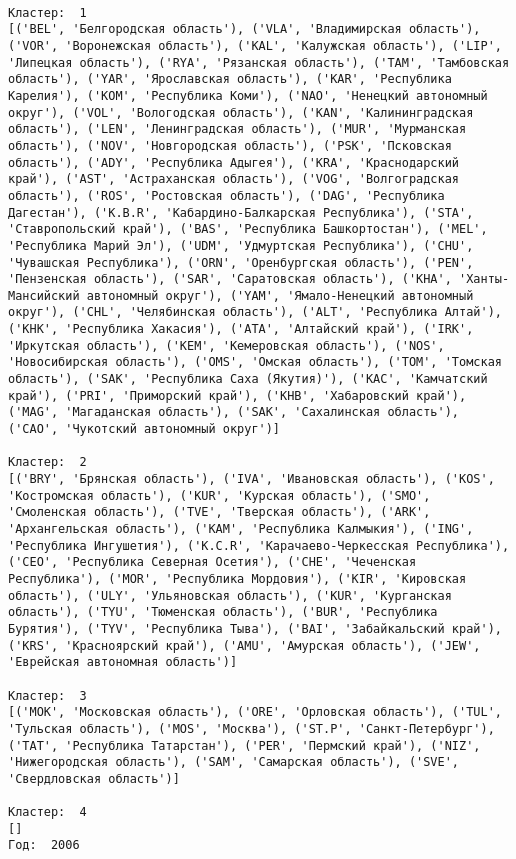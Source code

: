 \documentclass[11pt]{article}
\begin{document}
    \begin{Verbatim}[commandchars=\\\{\}]

Кластер:  1
[('BEL', 'Белгородская область'), ('VLA', 'Владимирская область'), ('VOR', 'Воронежская область'), ('KAL', 'Калужская область'), ('LIP', 'Липецкая область'), ('RYA', 'Рязанская область'), ('TAM', 'Тамбовская область'), ('YAR', 'Ярославская область'), ('KAR', 'Республика Карелия'), ('KOM', 'Республика Коми'), ('NAO', 'Ненецкий автономный округ'), ('VOL', 'Вологодская область'), ('KAN', 'Калинингpадская область'), ('LEN', 'Ленинградская область'), ('MUR', 'Мурманская область'), ('NOV', 'Новгородская область'), ('PSK', 'Псковская область'), ('ADY', 'Республика Адыгея'), ('KRA', 'Краснодарский край'), ('AST', 'Астраханская область'), ('VOG', 'Волгоградская область'), ('ROS', 'Ростовская область'), ('DAG', 'Республика Дагестан'), ('K.B.R', 'Кабардино-Балкарская Республика'), ('STA', 'Ставропольский край'), ('BAS', 'Республика Башкортостан'), ('MEL', 'Республика Марий Эл'), ('UDM', 'Удмуртская Республика'), ('CHU', 'Чувашская Республика'), ('ORN', 'Оренбургская область'), ('PEN', 'Пензенская область'), ('SAR', 'Саратовская область'), ('KHA', 'Ханты-Мансийский автономный округ'), ('YAM', 'Ямало-Ненецкий автономный округ'), ('CHL', 'Челябинская область'), ('ALT', 'Республика Алтай'), ('KHK', 'Республика Хакасия'), ('ATA', 'Алтайский край'), ('IRK', 'Иркутская область'), ('KEM', 'Кемеровская область'), ('NOS', 'Новосибирская область'), ('OMS', 'Омская область'), ('TOM', 'Томская область'), ('SAK', 'Республика Саха (Якутия)'), ('KAC', 'Камчатский край'), ('PRI', 'Приморский край'), ('KHB', 'Хабаровский край'), ('MAG', 'Магаданская область'), ('SAK', 'Сахалинская область'), ('CAO', 'Чукотский автономный округ')]

Кластер:  2
[('BRY', 'Брянская область'), ('IVA', 'Ивановская область'), ('KOS', 'Костромская область'), ('KUR', 'Курская область'), ('SMO', 'Смоленская область'), ('TVE', 'Тверская область'), ('ARK', 'Архангельская область'), ('KAM', 'Республика Калмыкия'), ('ING', 'Республика Ингушетия'), ('K.C.R', 'Карачаево-Черкесская Республика'), ('CEO', 'Республика Северная Осетия'), ('CHE', 'Чеченская Республика'), ('MOR', 'Республика Мордовия'), ('KIR', 'Кировская область'), ('ULY', 'Ульяновская область'), ('KUR', 'Курганская область'), ('TYU', 'Тюменская область'), ('BUR', 'Республика Бурятия'), ('TYV', 'Республика Тыва'), ('BAI', 'Забайкальский край'), ('KRS', 'Красноярский край'), ('AMU', 'Амурская область'), ('JEW', 'Еврейская автономная область')]

Кластер:  3
[('MOK', 'Московская область'), ('ORE', 'Орловская область'), ('TUL', 'Тульская область'), ('MOS', 'Москва'), ('ST.P', 'Санкт-Петербург'), ('TAT', 'Республика Татарстан'), ('PER', 'Пермский край'), ('NIZ', 'Нижегородская область'), ('SAM', 'Самарская область'), ('SVE', 'Свердловская область')]

Кластер:  4
[]
Год:  2006

    \end{Verbatim}
\end{document}
